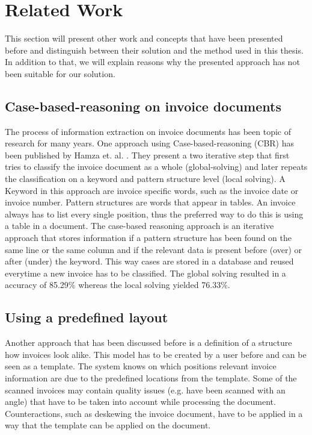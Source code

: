 \section{Related Work}
\label{sec1.4}
This section will present other work and concepts that have been presented before and distinguish between their solution and the method used in this thesis. In addition to that, we will explain reasons why the presented approach has not been suitable for our solution.

\subsection{Case-based-reasoning on invoice documents}
The process of information extraction on invoice documents has been topic of research for many years. One approach using Case-based-reasoning (CBR) has been published by Hamza et. al. \cite{hamza07}. They present a two iterative step that first tries to classify the invoice document as a whole (global-solving) and later repeats the classification on a keyword and pattern structure level (local solving). A Keyword in this approach are invoice specific words, such as the invoice date or invoice number. Pattern structures are words that appear in tables. An invoice always has to list every single position, thus the preferred way to do this is using a table in a document.
The case-based reasoning approach is an iterative approach that stores information if a pattern structure has been found on the same line or the same column and if the relevant data is present before (over) or after (under) the keyword. This way cases are stored in a database and reused everytime a new invoice has to be classified. The global solving resulted in a accuracy of 85.29\% whereas the local solving yielded 76.33\%.
\subsection{Using a predefined layout}
Another approach that has been discussed before \cite{Cesarini98} is a definition of a structure how invoices look alike. This model has to be created by a user before and can be seen as a template. The system knows on which positions relevant invoice information are due to the predefined locations from the template.
Some of the scanned invoices may contain quality issues (e.g. have been scanned with an angle) that have to be taken into account while processing the document. Counteractions, such as deskewing the invoice document, have to be applied in a way that the template can be applied on the document.

